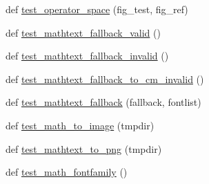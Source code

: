 \begin{DoxyCompactItemize}
def \hyperlink{namespacematplotlib_1_1tests_1_1test__mathtext_a29c9b2c5339e19d81245697a30a93467}{test\+\_\+operator\+\_\+space} (fig\+\_\+test, fig\+\_\+ref)
\item 
def \hyperlink{namespacematplotlib_1_1tests_1_1test__mathtext_aaf861b3b11b7bf25690e321cceee924c}{test\+\_\+mathtext\+\_\+fallback\+\_\+valid} ()
\item 
def \hyperlink{namespacematplotlib_1_1tests_1_1test__mathtext_a4b6fed4ea028db09e4bfe38f7c19d1a6}{test\+\_\+mathtext\+\_\+fallback\+\_\+invalid} ()
\item 
def \hyperlink{namespacematplotlib_1_1tests_1_1test__mathtext_a799e81202b38ede10b72f102ce17971d}{test\+\_\+mathtext\+\_\+fallback\+\_\+to\+\_\+cm\+\_\+invalid} ()
\item 
def \hyperlink{namespacematplotlib_1_1tests_1_1test__mathtext_a3c23c2d7793eb87256b3469c3da49b5a}{test\+\_\+mathtext\+\_\+fallback} (fallback, fontlist)
\item 
def \hyperlink{namespacematplotlib_1_1tests_1_1test__mathtext_a2f090eb07472e0a36c253ea4896a88c3}{test\+\_\+math\+\_\+to\+\_\+image} (tmpdir)
\item 
def \hyperlink{namespacematplotlib_1_1tests_1_1test__mathtext_a81a3271328c7be714da3bf444b021aa7}{test\+\_\+mathtext\+\_\+to\+\_\+png} (tmpdir)
\item 
def \hyperlink{namespacematplotlib_1_1tests_1_1test__mathtext_a5553fb084ad87b60e5d4dedb78e30766}{test\+\_\+math\+\_\+fontfamily} ()
\end{DoxyCompactItemize}
